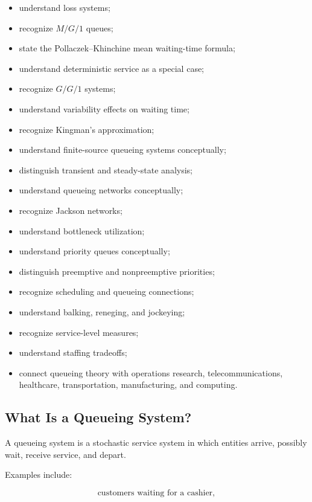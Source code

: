 {\begin{itemize}
    \item understand loss systems;
    \item recognize \(M/G/1\) queues;
    \item state the Pollaczek--Khinchine mean waiting-time formula;
    \item understand deterministic service as a special case;
    \item recognize \(G/G/1\) systems;
    \item understand variability effects on waiting time;
    \item recognize Kingman's approximation;
    \item understand finite-source queueing systems conceptually;
    \item distinguish transient and steady-state analysis;
    \item understand queueing networks conceptually;
    \item recognize Jackson networks;
    \item understand bottleneck utilization;
    \item understand priority queues conceptually;
    \item distinguish preemptive and nonpreemptive priorities;
    \item recognize scheduling and queueing connections;
    \item understand balking, reneging, and jockeying;
    \item recognize service-level measures;
    \item understand staffing tradeoffs;
    \item connect queueing theory with operations research,
          telecommunications, healthcare, transportation, manufacturing,
          and computing.
\end{itemize}
}

\subsection{What Is a Queueing System?}
\label{subsec:what-is-queueing-system}

A queueing system is a stochastic service system in which entities arrive,
possibly wait, receive service, and depart.

Examples include:

\[
\boxed{
\text{customers waiting for a cashier},
}
\]

